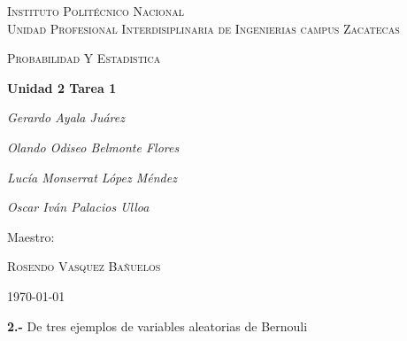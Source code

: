 \documentclass[12pt, letterpaper, spanish]{article}
\begin{document}
\begin{titlepage}
	\centering
	{\scshape\LARGE Instituto Politécnico Nacional\\ Unidad Profesional Interdisiplinaria de Ingenierias campus Zacatecas\par}
	\vspace{1cm}
	{\scshape\Large Probabilidad Y Estadistica\par}
	\vspace{1.5cm}
	{\huge\bfseries Unidad 2 Tarea 1\par}
	\vspace{2cm}
	{\Large\itshape Gerardo Ayala Juárez\par}
	{\Large\itshape Olando Odiseo Belmonte Flores\par}
	{\Large\itshape Lucía Monserrat López Méndez\par}
	{\Large\itshape Oscar Iván Palacios Ulloa\par}
	\vfill
	Maestro:\par
	\textsc{
	Rosendo Vasquez Bañuelos}
	\vfill
	{\large \today \par}
\end{titlepage}
\textbf{2.-} De tres ejemplos de variables aleatorias de Bernouli
\end{document}
